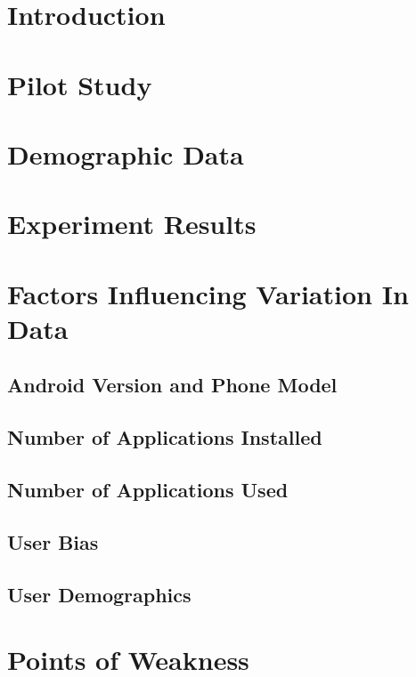 \documentclass[12pt]{uthesis-v12}  %
\begin{document}
	\section{Introduction}
	
	\section{Pilot Study}
	
	\section{Demographic Data}
	
	\section{Experiment Results}
	
	\section{Factors Influencing Variation In Data}
		
		\subsection{Android Version and Phone Model}
		
		\subsection{Number of Applications Installed}
		
		\subsection{Number of Applications Used}
		
		\subsection{User Bias}
		
		\subsection{User Demographics}
	
	\section{Points of Weakness}		
		
\end{document}
